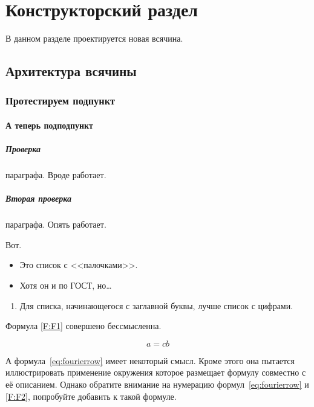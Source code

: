 \chapter{Конструкторский раздел}
\label{cha:design}

В данном разделе проектируется новая всячина.

\section{Архитектура всячины}

\subsection{Протестируем подпункт}
\subsubsection{А теперь подподпункт}


\paragraph{Проверка} параграфа. Вроде работает.
\paragraph{Вторая проверка} параграфа. Опять работает.

Вот.

\begin{itemize}
\item Это список с <<палочками>>.
\item Хотя он и по ГОСТ, но\dots
\end{itemize}

\begin{enumerate}
\item  Для списка, начинающегося с заглавной буквы, лучше список с цифрами.
\end{enumerate}

Формула \eqref{F:F1} совершено бессмысленна.


\begin{equation}
a= cb
\label{F:F1}
\end{equation}

А формула~\eqref{eq:fourierrow} имеет некоторый смысл.
Кроме этого она пытается иллюстрировать применение окружения  которое размещает формулу совместно с её описанием.
Однако обратите внимание на нумерацию формул~\eqref{eq:fourierrow} и \eqref{F:F2}, попробуйте добавить \Code{[H]} к такой формуле.

